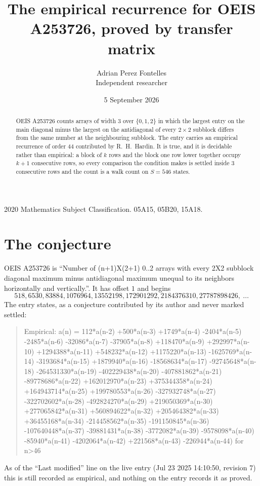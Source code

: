 \documentclass[11pt,a4paper]{article}
\title{The empirical recurrence for OEIS A253726, proved by transfer matrix}
\author{Adrian Perez Fontelles\\ \small Independent researcher}
\date{5 September 2026}
\theoremstyle{plain}
\theoremstyle{definition}
\begin{document}
\maketitle

\begin{abstract}
OEIS A253726 counts arrays of width $3$ over $\{0,1,2\}$ in which the largest entry on the main diagonal minus the largest on the antidiagonal of every $2\times2$ subblock differs from the same number at the neighbouring subblock. The entry carries an
empirical recurrence of order $44$ contributed by R.~H.~Hardin. It is true, and it is
decidable rather than empirical: a block of $k$ rows and the block one row lower together
occupy $k+1$ consecutive rows, so every comparison the condition makes is settled inside
$3$ consecutive rows and the count is a walk count on $S=546$ states.
\end{abstract}

\noindent\small 2020 Mathematics Subject Classification. 05A15, 05B20, 15A18.\normalsize

\section{The conjecture}

OEIS A253726 is ``Number of (n+1)X(2+1) 0..2 arrays with every 2X2 subblock diagonal maximum minus antidiagonal maximum unequal to its neighbors horizontally and vertically.''. It has offset $1$ and begins
\[
518, 6530, 83884, 1076964, 13552198, 172901292, 2184376310, 27787898426,\ \dots
\]
The entry states, as a conjecture contributed by its author and never marked settled:
\begin{quote}
Empirical: a(n) = 112*a(n-2) +500*a(n-3) +1749*a(n-4) -2404*a(n-5) -2485*a(n-6) -32086*a(n-7) -37905*a(n-8) +118470*a(n-9) +292997*a(n-10) +1294388*a(n-11) +548232*a(n-12) +1175220*a(n-13) -1625769*a(n-14) -3193684*a(n-15) +1879940*a(n-16) -18568634*a(n-17) -92745648*a(n-18) -264531330*a(n-19) -402229438*a(n-20) -407881862*a(n-21) -89778686*a(n-22) +162012970*a(n-23) +375344358*a(n-24) +164943714*a(n-25) +199780553*a(n-26) -327932748*a(n-27) -322702602*a(n-28) -492824270*a(n-29) +219050369*a(n-30) +277065842*a(n-31) +560894622*a(n-32) +205464382*a(n-33) +36455168*a(n-34) -214458562*a(n-35) -191150845*a(n-36) -107640448*a(n-37) -39881431*a(n-38) -3772082*a(n-39) -9578098*a(n-40) -85940*a(n-41) -4202064*a(n-42) +221568*a(n-43) -226944*a(n-44) for n>46
\end{quote}
As of the ``Last modified'' line on the live entry (Jul 23 2025 14:10:50, revision 7) this is still
recorded as empirical, and nothing on the entry records it as proved.
\end{document}
